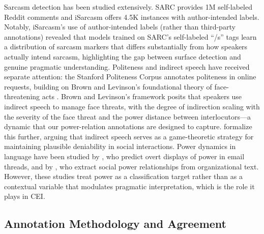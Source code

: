\documentclass[twoside,11pt]{article}
\begin{document}
Sarcasm detection has been studied extensively. SARC \citep{khodak2018large} provides 1M self-labeled Reddit comments and iSarcasm \citep{oprea2020isarcasm} offers 4.5K instances with author-intended labels. Notably, iSarcasm's use of author-intended labels (rather than third-party annotations) revealed that models trained on SARC's self-labeled ``/s'' tags learn a distribution of sarcasm markers that differs substantially from how speakers actually intend sarcasm, highlighting the gap between surface detection and genuine pragmatic understanding. Politeness and indirect speech have received separate attention: the Stanford Politeness Corpus \citep{danescu2013computational} annotates politeness in online requests, building on Brown and Levinson's foundational theory of face-threatening acts \citep{brown1987politeness}. Brown and Levinson's framework posits that speakers use indirect speech to manage face threats, with the degree of indirection scaling with the severity of the face threat and the power distance between interlocutors---a dynamic that our power-relation annotations are designed to capture. \citet{pinker2008logic} formalize this further, arguing that indirect speech serves as a game-theoretic strategy for maintaining plausible deniability in social interactions. Power dynamics in language have been studied by \citet{prabhakaran2012power}, who predict overt displays of power in email threads, and by \citet{bramsen2011extracting}, who extract social power relationships from organizational text. However, these studies treat power as a classification target rather than as a contextual variable that modulates pragmatic interpretation, which is the role it plays in CEI.

\subsection{Annotation Methodology and Agreement}
\end{document}
